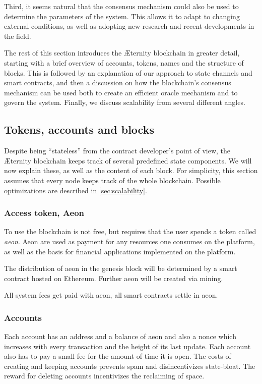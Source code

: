 \documentclass[a4paper, 10pt, conference]{ieeeconf}      %
\begin{document}
\begin{draft}
Third, it seems natural that the consensus mechanism could also be used to determine the parameters of the system. This allows it to adapt to changing external conditions, as well as adopting new research and recent developments in the field.

The rest of this section introduces the Æternity blockchain in greater detail, starting with a brief overview of accounts, tokens, names and the structure of blocks. This is followed by an explanation of our approach to state channels and smart contracts, and then a discussion on how the blockchain's consensus mechanism can be used both to create an efficient oracle mechanism and to govern the system. Finally, we discuss scalability from several different angles.


\subsection{Tokens, accounts and blocks}
Despite being ``stateless'' from the contract developer's point of view, the Æternity blockchain keeps track of several predefined state components. We will now explain these, as well as the content of each block. For simplicity, this section assumes that every node keeps track of the whole blockchain. Possible optimizations are described in \cref{sec:scalability}.

\subsubsection{Access token, Aeon}
To use the blockchain is not free, but requires that the user spends a token called \emph{aeon}. Aeon are used as payment for any resources one consumes on the platform, as well as the basis for financial applications implemented on the platform. 

The distribution of aeon in the genesis block will be determined by a smart contract hosted on Ethereum. Further aeon will be created via mining.

All system fees get paid with aeon, all smart contracts settle in aeon.%

\subsubsection{Accounts}
Each account has an address and a balance of aeon and also a nonce which increases with every transaction and the height of its last update. Each account also has to pay a small fee for the amount of time it is open. The costs of creating and keeping accounts prevents spam and disincentivizes state-bloat. The reward for deleting accounts incentivizes the reclaiming of space.



\end{draft}
\end{document}
